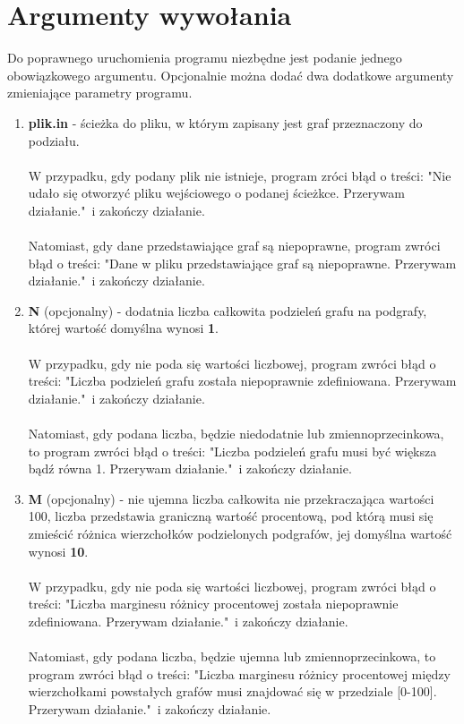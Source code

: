 \documentclass{article}
\begin{document}
\section*{Argumenty wywołania}
Do poprawnego uruchomienia programu niezbędne jest podanie jednego obowiązkowego argumentu. Opcjonalnie można dodać dwa dodatkowe argumenty zmieniające parametry programu.
\begin{enumerate}
    \item \textbf{plik.in} - ścieżka do pliku, w którym zapisany jest graf przeznaczony do podziału.\\\\
    W przypadku, gdy podany plik nie istnieje, program zróci błąd o treści: "Nie udało się otworzyć pliku wejściowego o podanej ścieżkce. Przerywam działanie."\ i zakończy działanie.\\\\
    Natomiast, gdy dane przedstawiające graf są niepoprawne, program zwróci błąd o treści: "Dane w pliku przedstawiające graf są niepoprawne. Przerywam działanie."\ i zakończy działanie.
    
    \item \textbf{N} (opcjonalny) -  dodatnia liczba całkowita podzieleń grafu na podgrafy, której wartość domyślna wynosi \textbf{1}.\\\\
    W przypadku, gdy nie poda się wartości liczbowej, program zwróci błąd o treści: "Liczba podzieleń grafu została niepoprawnie zdefiniowana. Przerywam działanie."\ i zakończy działanie.\\\\
    Natomiast, gdy podana liczba, będzie niedodatnie lub zmiennoprzecinkowa, to program zwróci błąd o treści: "Liczba podzieleń grafu musi być większa bądź równa 1. Przerywam działanie."\ i zakończy działanie.

    \item \textbf{M} (opcjonalny) - nie ujemna liczba całkowita nie przekraczająca wartości 100, liczba przedstawia graniczną wartość procentową, pod którą musi się zmieścić różnica wierzchołków podzielonych podgrafów, jej domyślna wartość wynosi \textbf{10}.\\\\
    W przypadku, gdy nie poda się wartości liczbowej, program zwróci błąd o treści: "Liczba marginesu różnicy procentowej została niepoprawnie zdefiniowana. Przerywam działanie."\ i zakończy działanie.\\\\
    Natomiast, gdy podana liczba, będzie ujemna lub zmiennoprzecinkowa, to program zwróci błąd o treści: "Liczba marginesu różnicy procentowej między wierzchołkami powstałych grafów musi znajdować się w przedziale [0-100]. Przerywam działanie."\ i zakończy działanie.
\end{enumerate}
\end{document}
